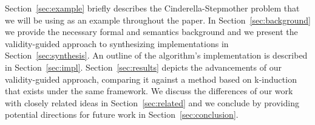 
Section~\ref{sec:example} briefly describes the Cinderella-Stepmother problem that we will be using as an example throughout the paper. In Section~\ref{sec:background} we provide the necessary formal and semantics background and we present the validity-guided approach to synthesizing implementations in Section~\ref{sec:synthesis}.
An outline of the algorithm's implementation is described in Section~\ref{sec:impl}. Section~\ref{sec:results} depicts the advancements of our validity-guided
approach, comparing it against a method based on k-induction that exists under the same framework. We discuss the differences of our work with closely related ideas in Section~\ref{sec:related} and we conclude by providing potential directions for future work in Section~\ref{sec:conclusion}.

	
